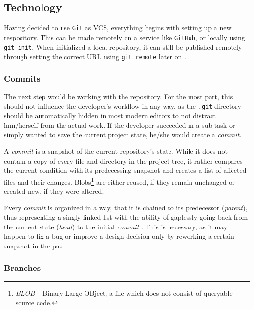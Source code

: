
\subsection{Technology}
\label{sec:git-technology}
Having decided to use \texttt{Git} as VCS, everything begins with setting up a new respository. This can be made remotely on a service like \texttt{GitHub}, or locally using \texttt{git init}. When initialized a local repository, it can still be published remotely through setting the correct URL using \texttt{git remote} later on \cite[198]{loeliger2012version}.

\subsubsection{Commits}
The next step would be working with the repository. For the most part, this should not influence the developer's workflow in any way, as the \texttt{.git} directory should be automatically hidden in most modern editors to not distract him/herself from the actual work. If the developer succeeded in a sub-task or simply wanted to save the current project state, he/she would create a \emph{commit}.

A \emph{commit} is a snapshot of the current repository's state. While it does not contain a copy of every file and directory in the project tree, it rather compares the current condition with its predecessing snapshot and creates a list of affected files and their changes. Blobs\footnote{\emph{BLOB} -- Binary Large OBject, a file which does not consist of queryable source code.} are either reused, if they remain unchanged or created new, if they were altered\cite[65]{loeliger2012version}.

Every \emph{commit} is organized in a way, that it is chained to its predecessor (\emph{parent}), thus representing a singly linked list with the ability of gaplessly going back from the current state (\emph{head}) to the initial \emph{commit} \cite[204]{dhillon2016}\cite[65]{loeliger2012version}. This is necessary, as it may happen to fix a bug or improve a design decision only by reworking a certain snapshot in the past \cite[151]{loeliger2012version}.

\subsubsection{Branches}


